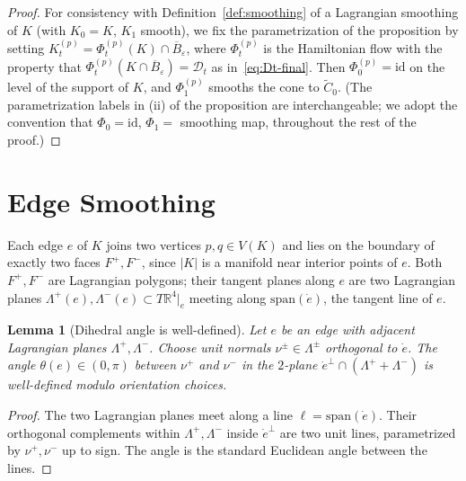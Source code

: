 \documentclass[12pt]{article}
\newtheorem{lemma}[theorem]{Lemma}
\theoremstyle{definition}
\begin{document}
\begin{proof}
For consistency with Definition~\ref{def:smoothing} of a Lagrangian smoothing of $K$ (with $K_0=K$, $K_1$ smooth), we fix the parametrization of the proposition by setting $K_t^{(p)}=\Phi_t^{(p)}(K)\cap\overline{B}_\varepsilon$, where $\Phi_t^{(p)}$ is the Hamiltonian flow with the property that $\Phi_t^{(p)}(K\cap\overline{B}_\varepsilon)=\mathcal{D}_t$ as in~\eqref{eq:Dt-final}. Then $\Phi_0^{(p)}=\mathrm{id}$ on the level of the support of $K$, and $\Phi_1^{(p)}$ smooths the cone to $\widetilde{C}_0$. (The parametrization labels in (ii) of the proposition are interchangeable; we adopt the convention that $\Phi_0=\mathrm{id}$, $\Phi_1=$ smoothing map, throughout the rest of the proof.)
\end{proof}

\section{Edge Smoothing}

Each edge $e$ of $K$ joins two vertices $p,q\in V(K)$ and lies on the boundary of exactly two faces $F^+,F^-$, since $|K|$ is a manifold near interior points of $e$. Both $F^+,F^-$ are Lagrangian polygons; their tangent planes along $e$ are two Lagrangian planes $\Lambda^+(e),\Lambda^-(e)\subset T\mathbb{R}^4|_e$ meeting along $\mathrm{span}(\dot e)$, the tangent line of $e$.

\begin{lemma}[Dihedral angle is well-defined]\label{lem:dihedral}
Let $e$ be an edge with adjacent Lagrangian planes $\Lambda^+,\Lambda^-$. Choose unit normals $\nu^\pm\in\Lambda^\pm$ orthogonal to $\dot e$. The angle $\theta(e)\in(0,\pi)$ between $\nu^+$ and $\nu^-$ in the $2$-plane $\dot e^\perp\cap(\Lambda^++\Lambda^-)$ is well-defined modulo orientation choices.
\end{lemma}

\begin{proof}
The two Lagrangian planes meet along a line $\ell=\mathrm{span}(\dot e)$. Their orthogonal complements within $\Lambda^+,\Lambda^-$ inside $\dot e^\perp$ are two unit lines, parametrized by $\nu^+,\nu^-$ up to sign. The angle is the standard Euclidean angle between the lines.
\end{proof}
\end{document}
